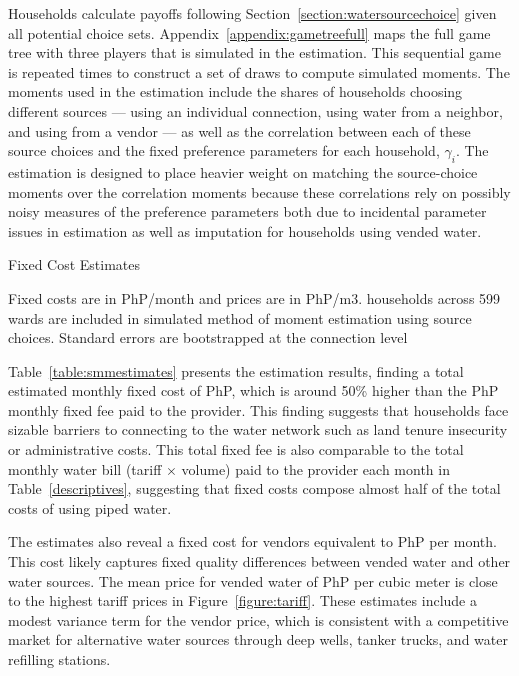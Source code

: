 \documentclass[12pt]{article}
\begin{document}
Households calculate payoffs following Section~\ref{section:watersourcechoice} given all potential choice sets.  Appendix~\ref{appendix:gametreefull} maps the full game tree with three players that is simulated in the estimation.  This sequential game is repeated times to construct a set of draws to compute simulated moments.  The moments used in the estimation include the shares of households choosing different sources --- using an individual connection, using water from a neighbor, and using from a vendor --- as well as the correlation between each of these source choices and the fixed preference parameters for each household, $\gamma_i$.  The estimation is designed to place heavier weight on matching the source-choice moments over the correlation moments because these correlations rely on possibly noisy measures of the preference parameters both due to incidental parameter issues in estimation as well as imputation for households using vended water.  %
\begin{table}
\centering
\begin{threeparttable}
\caption{Fixed Cost Estimates}\label{table:smmestimates}

\begin{tablenotes}
\item \footnotesize{  Fixed costs are in PhP/month and prices are in PhP/m3.    households across 599 wards are included in simulated method of moment estimation using source choices.  Standard errors are bootstrapped at the connection level }
\end{tablenotes}
\end{threeparttable}
\end{table}
Table~\ref{table:smmestimates} presents the estimation results, finding a total estimated monthly fixed cost of PhP, which is around 50\% higher than the PhP monthly fixed fee paid to the provider.  This finding suggests that households face sizable barriers to connecting to the water network such as land tenure insecurity or administrative costs.  This total fixed fee is also comparable to the total monthly water bill (tariff $\times$ volume) paid to the provider each month in Table~\ref{descriptives}, suggesting that fixed costs compose almost half of the total costs of using piped water.  

The estimates also reveal a fixed cost for vendors equivalent to PhP per month.  This cost likely captures fixed quality differences between vended water and other water sources.  The mean price for vended water of PhP per cubic meter is close to the highest tariff prices in Figure~\ref{figure:tariff}.  These estimates include a modest variance term for the vendor price, which is consistent with a competitive market for alternative water sources through deep wells, tanker trucks, and water refilling stations.  
\end{document}
